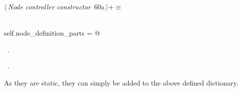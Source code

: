 \documentclass[
    a4paper,      %
    10pt,         %
    openright,    %
    notitlepage,  %
    parskip=half, %
]{scrreprt}       %
\theoremstyle{definition}                    %
\begin{document}
\begin{flushleft} \small
\begin{minipage}{\linewidth}\label{scrap100}\raggedright\small
{} $\langle\,${\itshape Node controller constructor}\nobreak\ {\footnotesize {60a}}$\,\rangle+\equiv$
\vspace{-1ex}
\begin{list}{}{} \item
\mbox{}\lstinline@@\\
\mbox{}\lstinline@    self.node_definition_parts = {}@\\
\mbox{}\lstinline@@{\NWsep}
\end{list}
\vspace{-1.5ex}
\footnotesize
\begin{list}{}{\setlength{\itemsep}{-\parsep}\setlength{\itemindent}{-\leftmargin}}
\item \NWtxtMacroDefBy\ .
\item \NWtxtMacroRefIn\ .

\item{}
\end{list}
\end{minipage}\vspace{4ex}
\end{flushleft}
As they are static, they can simply be added to the above defined dictionary.
\end{document}
